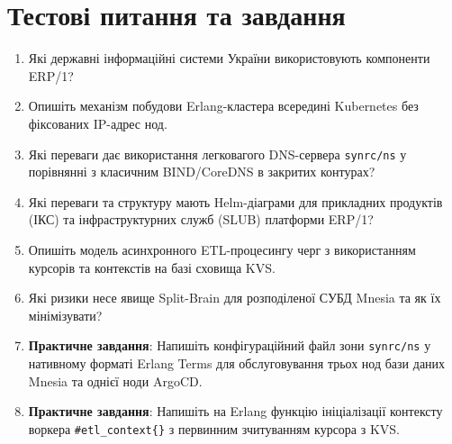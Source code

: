 \documentclass{article}
\begin{document}
\section{Тестові питання та завдання}
\begin{enumerate}
    \item Які державні інформаційні системи України використовують компоненти ERP/1?
    \item Опишіть механізм побудови Erlang-кластера всередині Kubernetes без фіксованих IP-адрес нод.
    \item Які переваги дає використання легковагого DNS-сервера \texttt{synrc/ns} у порівнянні з класичним BIND/CoreDNS в закритих контурах?
    \item Які переваги та структуру мають Helm-діаграми для прикладних продуктів (ІКС) та інфраструктурних служб (SLUB) платформи ERP/1?
    \item Опишіть модель асинхронного ETL-процесингу черг з використанням курсорів та контекстів на базі сховища KVS.
    \item Які ризики несе явище Split-Brain для розподіленої СУБД Mnesia та як їх мінімізувати?
    \item \textbf{Практичне завдання}: Напишіть конфігураційний файл зони \texttt{synrc/ns} у нативному форматі Erlang Terms для обслуговування трьох нод бази даних Mnesia та однієї ноди ArgoCD.
    \item \textbf{Практичне завдання}: Напишіть на Erlang функцію ініціалізації контексту воркера \texttt{\#etl\_context\{\}} з первинним зчитуванням курсора з KVS.
\end{enumerate}
\end{document}
